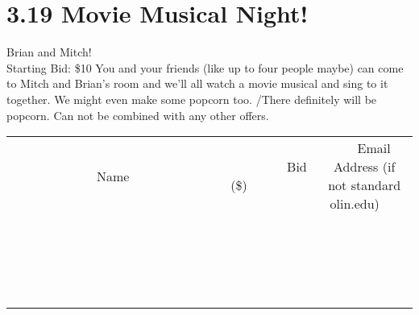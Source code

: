 \documentclass[11pt]{article}
\begin{document}
\section*{3.19 Movie Musical Night!}
Brian and Mitch!
\\
Starting Bid: \$10
\newline
You and your friends (like up to four people maybe) can come to Mitch and Brian's room and we'll all watch a movie musical and sing to it together. We might even make some popcorn too. /There definitely will be popcorn. Can not be combined with any other offers.
\\[3ex]
\begin{tabular}{c c c}
~~~~~~~~~~~~~Name~~~~~~~~~~~~~ & ~~~~~~~~~Bid (\$)~~~~~~~~~  & ~~~Email Address (if not standard olin.edu)~~~\\
 & & \\
\hline
 & & \\
\hline
 & & \\
\hline
 & & \\
\hline
 & & \\
\hline
 & & \\
\hline
 & & \\
\hline
 & & \\
\hline
 & & \\
\hline
 & & \\
\hline
 & & \\
\hline
 & & \\
\hline
 & & \\
\hline
 & & \\
\hline
 & & \\
\hline
 & & \\
\hline
 & & \\
\hline
 & & \\
\hline
 & & \\
\hline
\end{tabular}
\newpage
\end{document}
